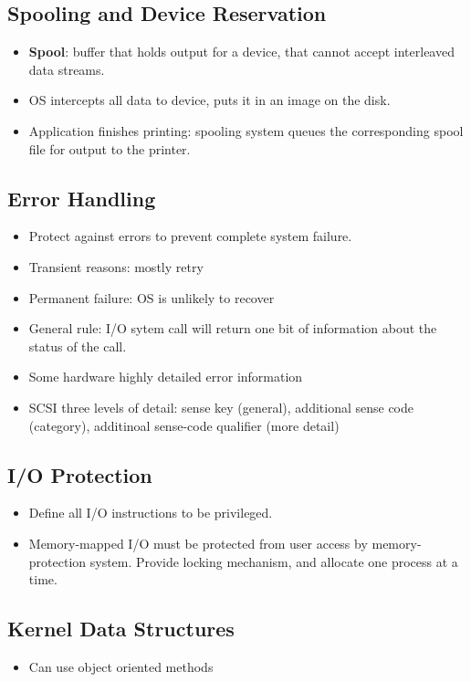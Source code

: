 \documentclass[10pt]{report}
\begin{document}
		\subsection{Spooling and Device Reservation}
			\begin{itemize}
				\item \textbf{Spool}: buffer that holds output for a device, that cannot accept interleaved data streams.
				\item OS intercepts all data to device, puts it in an image on the disk.
				\item Application finishes printing: spooling system queues the corresponding spool file for output to the printer.
			\end{itemize}

		\subsection{Error Handling}
			\begin{itemize}
				\item Protect against errors to prevent complete system failure.
				\item Transient reasons: mostly retry
				\item Permanent failure: OS is unlikely to recover
				\item General rule: I/O sytem call will return one bit of information about the status of the call.
				\item Some hardware highly detailed error information
				\item SCSI three levels of detail: sense key (general), additional sense code (category), additinoal sense-code qualifier (more detail)
			\end{itemize}

		\subsection{I/O Protection}
			\begin{itemize}
				\item Define all I/O instructions to be privileged.
				\item Memory-mapped I/O must be protected from user access by memory-protection system. Provide locking mechanism, and allocate one process at a time.
			\end{itemize}

		\subsection{Kernel Data Structures}
			\begin{itemize}
				\item Can use object oriented methods
			\end{itemize}
\end{document}
